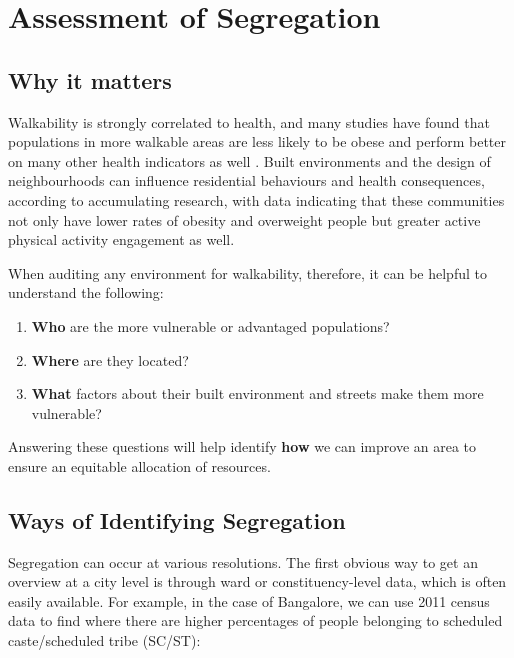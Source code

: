 \documentclass[
]{latex/krantz}
\providecommand{\tightlist}{%
  \setlength{\itemsep}{0pt}\setlength{\parskip}{0pt}}
\begin{document}
\hypertarget{assessment-of-segregation}{%
\section{Assessment of Segregation}\label{assessment-of-segregation}}

\hypertarget{why-it-matters}{%
\subsection{Why it matters}\label{why-it-matters}}

Walkability is strongly correlated to health, and many studies have found that populations in more walkable areas are less likely to be obese \autocite{riggsInclusivelyWalkableExploring2016} and perform better on many other health indicators as well \autocite{suCommunityDeprivationWalkability2017}. Built environments and the design of neighbourhoods can influence residential behaviours and health consequences, according to accumulating research, with data indicating that these communities not only have lower rates of obesity and overweight people but greater active physical activity engagement as well.

When auditing any environment for walkability, therefore, it can be helpful to understand the following:

\begin{enumerate}
\def\labelenumi{\arabic{enumi}.}
\tightlist
\item
  \textbf{Who} are the more vulnerable or advantaged populations?
\item
  \textbf{Where} are they located?
\item
  \textbf{What} factors about their built environment and streets make them more vulnerable?
\end{enumerate}

Answering these questions will help identify \textbf{how} we can improve an area to ensure an equitable allocation of resources.

\hypertarget{identify-segregation}{%
\subsection{Ways of Identifying Segregation}\label{identify-segregation}}

Segregation can occur at various resolutions. The first obvious way to get an overview at a city level is through ward or constituency-level data, which is often easily available. For example, in the case of Bangalore, we can use 2011 census data to find where there are higher percentages of people belonging to scheduled caste/scheduled tribe (SC/ST):
\end{document}

